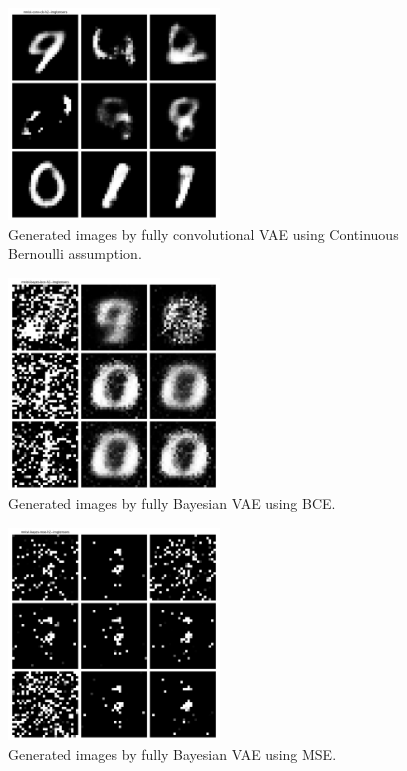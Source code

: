 \begin{appendices}
\begin{figure}[H]
    \centering
    \includegraphics[width=0.5\textwidth]{code/figs/mnist-conv-cb-h2--reconstruction.png}
    \caption{Generated images by fully convolutional VAE using Continuous Bernoulli assumption.}
    \label{fig:ConvVAE-CB-images}
\end{figure}

\begin{figure}[H]
    \centering
    \includegraphics[width=0.5\textwidth]{code/figs/mnist-bayes-bce-h2--reconstruction.png}
    \caption{Generated images by fully Bayesian VAE using BCE.}
    \label{fig:BVAE-BCE-images}
\end{figure}

\begin{figure}[H]
    \centering
    \includegraphics[width=0.5\textwidth]{code/figs/mnist-bayes-mse-h2--reconstruction.png}
    \caption{Generated images by fully Bayesian VAE using MSE.}
    \label{fig:BVAE-MSE-images}
\end{figure}


\end{appendices}
